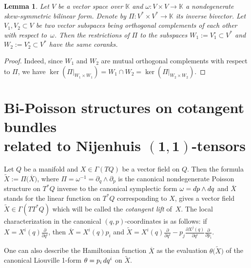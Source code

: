 \documentclass[11pt]{article}
\numberwithin{equation}{section}
\newtheorem{Lemma}[Theorem]{Lemma}
\begin{document}
\begin{Lemma}\label{lemM}Let $V$ be a vector space over $\mathbb{K}$ and $\omega\colon V\times V\to \mathbb{K}$ a nondegenerate skew-symmetric bilinear form. Denote by $\Pi\colon V^*\times V^*\to\mathbb{K}$ its inverse bivector. Let $V_1,V_2 \subset V$ be two vector subspaces being orthogonal complements of each other with respect to~$\omega$. Then the restrictions of $\Pi$ to the subspaces $W_1:=V_1^\circ \subset V^*$ and $W_2:=V_2^\circ \subset V^*$ have the same coranks.
\end{Lemma}

\begin{proof} Indeed, since $W_1$ and $W_2$ are mutual orthogonal complements with respect to $\Pi$, we have $\ker(\Pi|_{W_1\times W_1})=W_1\cap W_2=\ker(\Pi|_{W_2\times W_2})$.
\end{proof}

\section[Bi-Poisson structures on cotangent bundles related to Nijenhuis $(1,1)$-tensors]{Bi-Poisson structures on cotangent bundles\\ related to Nijenhuis $\boldsymbol{(1,1)}$-tensors}\label{sec:Bi-Poisson}

\begin{Definition}\label{defi2}Let $Q$ be a manifold and $X\in \Gamma(TQ)$ be a vector field on $Q$. Then the formula $\widetilde X:=\Pi\big(\overline X\big)$, where $\Pi=\omega^{-1}=\partial_q\wedge\partial_p$ is the canonical nondegenerate Poisson structure on $T^*Q$ inverse to the canonical symplectic form $\omega={\rm d}p\wedge {\rm d}q$ and $\overline X$ stands for the linear function on $T^*Q$ corresponding to $X$, gives a vector field $\widetilde X\in\Gamma(TT^*Q)$ which will be called the {\em cotangent lift} of~$X$. The local characterization in the canonical $(q,p)$-coordinates is as follows: if $X=X^i(q)\frac{\partial }{\partial q^i}$, then $\overline{X}=X^i(q)p_i$ and $\widetilde X=X^i(q)\frac{\partial }{\partial q^i}-p_j\frac{\partial X^j(q)}{\partial q^i}\frac{\partial }{\partial p_i}$.
\end{Definition}

\begin{Remark}\label{reem} One can also describe the Hamiltonian function $\overline{X}$ as the evaluation $\theta\big(\widetilde{X}\big)$ of the canonical Liouville 1-form $\theta=p_i\,{\rm d}q^i$ on $\widetilde{X}$.
\end{Remark}
\end{document}
